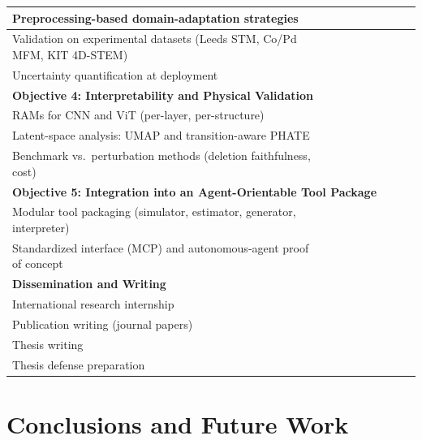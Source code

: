 \documentclass[letterpaper, 12, one column]{article}
\begin{document}
\begin{table}[H]
\begin{tabular}{|p{5.9cm}|c|c|c|c|c|c|c|c|}
\hline
Preprocessing-based domain-adaptation strategies & & & & & \cellcolor{orange!30} & \cellcolor{orange!30} & & \\
\hline
Validation on experimental datasets (Leeds STM, Co/Pd MFM, KIT 4D-STEM) & & & & & & \cellcolor{orange!30} & \cellcolor{orange!30} & \\
\hline
Uncertainty quantification at deployment & & & & & & & \cellcolor{orange!30} & \\
\hline
\multicolumn{9}{|l|}{\textbf{Objective 4: Interpretability and Physical Validation}} \\
\hline
RAMs for CNN and ViT (per-layer, per-structure) & & & \cellcolor{purple!30} & \cellcolor{purple!30} & & & & \\
\hline
Latent-space analysis: UMAP and transition-aware PHATE & & & & & \cellcolor{purple!30} & \cellcolor{purple!30} & & \\
\hline
Benchmark vs.\ perturbation methods (deletion faithfulness, cost) & & & & & & \cellcolor{purple!30} & \cellcolor{purple!30} & \\
\hline
\multicolumn{9}{|l|}{\textbf{Objective 5: Integration into an Agent-Orientable Tool Package}} \\
\hline
Modular tool packaging (simulator, estimator, generator, interpreter) & & & & & & \cellcolor{red!25} & \cellcolor{red!25} & \\
\hline
Standardized interface (MCP) and autonomous-agent proof of concept & & & & & & & \cellcolor{red!25} & \cellcolor{red!25} \\
\hline
\multicolumn{9}{|l|}{\textbf{Dissemination and Writing}} \\
\hline
International research internship & & & & & \cellcolor{cyan!30} & \cellcolor{cyan!30} & & \\
\hline
Publication writing (journal papers) & & & \cellcolor{yellow!40} & \cellcolor{yellow!40} & \cellcolor{yellow!40} & \cellcolor{yellow!40} & \cellcolor{yellow!40} & \cellcolor{yellow!40} \\
\hline
Thesis writing & & & & & & & \cellcolor{gray!30} & \cellcolor{gray!30} \\
\hline
Thesis defense preparation & & & & & & & & \cellcolor{gray!30} \\
\hline
\end{tabular}
\end{table}


\section{Conclusions and Future Work} \label{sec:Conclusions}
\end{document}
